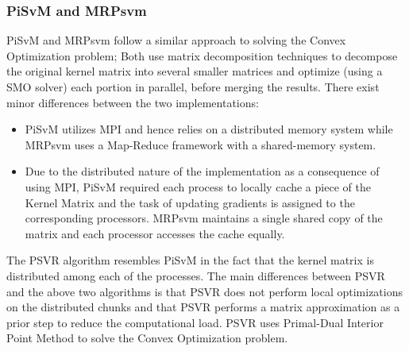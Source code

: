 \documentclass[12pt]{article}
\begin{document}
\subsubsection{PiSvM and MRPsvm}
\label{PiSvM and MRPsvm}
PiSvM and MRPsvm follow a similar approach to solving the Convex Optimization problem; Both use matrix decomposition techniques to decompose the original kernel matrix into several smaller matrices and optimize (using a SMO solver) each portion in parallel, before merging the results. There exist minor differences between the two implementations:
\begin{itemize}
\item PiSvM utilizes MPI and hence relies on a distributed memory system while MRPsvm uses a Map-Reduce framework with a shared-memory system.
\item Due to the distributed nature of the implementation as a consequence of using MPI, PiSvM required each process to locally cache a piece of the Kernel Matrix and the task of updating gradients is assigned to the corresponding processors. MRPsvm maintains a single shared copy of the matrix and each processor accesses the cache equally.
\end{itemize}

The PSVR algorithm resembles PiSvM in the fact that the kernel matrix is distributed among each of the processes. The main differences between PSVR and the above two algorithms is that PSVR does not perform local optimizations on the distributed chunks and that PSVR performs a matrix approximation as a prior step to reduce the computational load. PSVR uses Primal-Dual Interior Point Method to solve the Convex Optimization problem.
\newline
\end{document}
